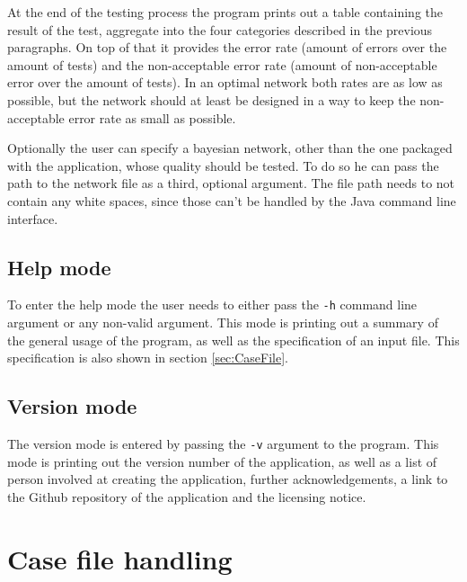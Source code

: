 \documentclass[%
	pdftex,
	oneside,        %
	11pt,           %
	parskip=half,   %
	headsepline,    %
	footsepline,    %
	abstracton,     %
	USenglish,      %
	a4paper,        %
]{report}
\begin{document}
At the end of the testing process the program prints out a table containing the result of the test, aggregate into the four categories described in the previous paragraphs. On top of that it provides the error rate (amount of errors over the amount of tests) and the non-acceptable error rate (amount of non-acceptable error over the amount of tests). In an optimal network both rates are as low as possible, but the network should at least be designed in a way to keep the non-acceptable error rate as small as possible.

Optionally the user can specify a bayesian network, other than the one packaged with the application, whose quality should be tested. To do so he can pass the path to the network file as a third, optional argument. The file path needs to not contain any white spaces, since those can't be handled by the Java command line interface.

\subsection{Help mode}
\label{sec:Help}
To enter the help mode the user needs to either pass the \texttt{-h} command line argument or any non-valid argument. This mode is printing out a summary of the general usage of the program, as well as the specification of an input file. This specification is also shown in section \vref{sec:CaseFile}.

\subsection{Version mode}
The version mode is entered by passing the \texttt{-v} argument to the program. This mode is printing out the version number of the application, as well as a list of person involved at creating the application, further acknowledgements, a link to the Github repository of the application and the licensing notice.

\section{Case file handling}
\label{sec:CaseFile}

%

\printbibliography

\begin{appendices}
    
    
\end{appendices}
\end{document}
